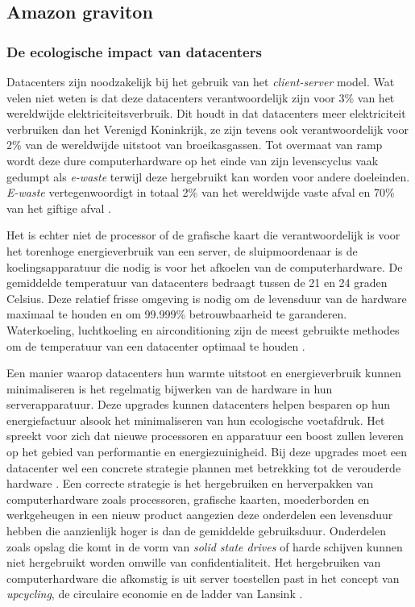 \subsection{Amazon graviton}
\subsubsection{De ecologische impact van datacenters}
Datacenters zijn noodzakelijk bij het gebruik van het \textit{client-server} model. Wat velen niet weten is dat deze datacenters verantwoordelijk zijn voor 3\% van het wereldwijde elektriciteitsverbruik. Dit houdt in dat datacenters meer elektriciteit verbruiken dan het Verenigd Koninkrijk, ze zijn tevens ook verantwoordelijk voor 2\% van de wereldwijde uitstoot van broeikasgassen. Tot overmaat van ramp wordt deze dure computerhardware op het einde van zijn levenscyclus vaak gedumpt als \textit{e-waste} terwijl deze hergebruikt kan worden voor andere doeleinden. \textit{E-waste} vertegenwoordigt in totaal 2\% van het wereldwijde vaste afval en 70\% van het giftige afval \autocite{Supermicro2018}.

Het is echter niet de processor of de grafische kaart die verantwoordelijk is voor het torenhoge energieverbruik van een server, de sluipmoordenaar is de koelingsapparatuur die nodig is voor het afkoelen van de computerhardware. De gemiddelde temperatuur van datacenters bedraagt tussen de 21 en 24 graden Celsius. Deze relatief frisse omgeving is nodig om de levensduur van de hardware maximaal te houden en om 99.999\% betrouwbaarheid te garanderen. Waterkoeling, luchtkoeling en airconditioning zijn de meest gebruikte methodes om de temperatuur van een datacenter optimaal te houden \autocite{Miller2022}.

Een manier waarop datacenters hun warmte uitstoot en energieverbruik kunnen minimaliseren is het regelmatig bijwerken van de hardware in hun serverapparatuur. Deze upgrades kunnen datacenters helpen besparen op hun energiefactuur alsook het minimaliseren van hun ecologische voetafdruk. Het spreekt voor zich dat nieuwe processoren en apparatuur een boost zullen leveren op het gebied van performantie en energiezuinigheid. Bij deze upgrades moet een datacenter wel een concrete strategie plannen met betrekking tot de verouderde hardware \autocite{Supermicro2018}. Een correcte strategie is het hergebruiken en herverpakken van computerhardware zoals processoren, grafische kaarten, moederborden en werkgeheugen in een nieuw product aangezien deze onderdelen een levensduur hebben die aanzienlijk hoger is dan de gemiddelde gebruiksduur. Onderdelen zoals opslag die komt in de vorm van \textit{solid state drives} of harde schijven kunnen niet hergebruikt worden omwille van confidentialiteit. Het hergebruiken van computerhardware die afkomstig is uit server toestellen past in het concept van \textit{upcycling}, de circulaire economie en de ladder van Lansink \autocite{VanAcker2017}.

